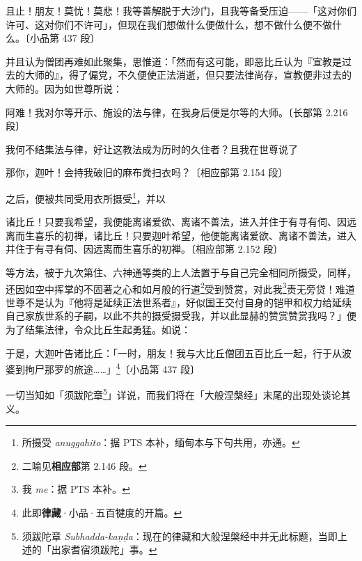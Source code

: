 \begin{quoting}且止！朋友！莫忧！莫悲！我等善解脱于大沙门，且我等备受压迫——「这对你们许可、这对你们不许可」，但现在我们想做什么便做什么，想不做什么便不做什么。{\bluefootnotesize 〔小品第 437 段〕}\end{quoting}

并且认为僧团再难如此聚集，思惟道：「然而有这可能，即恶比丘认为『宣教是过去的大师的』，得了偏党，不久便使正法消逝，但只要法律尚存，宣教便非过去的大师的。因为如世尊所说：

\begin{quoting}阿难！我对尔等开示、施设的法与律，在我身后便是尔等的大师。{\bluefootnotesize 〔长部第 2.216 段〕}\end{quoting}

我何不结集法与律，好让这教法成为历时的久住者？且我在世尊说了

\begin{quoting}那你，迦叶！会持我破旧的麻布粪扫衣吗？{\bluefootnotesize 〔相应部第 2.154 段〕}\end{quoting}

之后，便被共同受用衣所摄受\footnote{所摄受 \textit{anuggahito}：据 PTS 本补，缅甸本与下句共用，亦通。}，并以

\begin{quoting}诸比丘！只要我希望，我便能离诸爱欲、离诸不善法，进入并住于有寻有伺、因远离而生喜乐的初禅，诸比丘！只要迦叶希望，他便能离诸爱欲、离诸不善法，进入并住于有寻有伺、因远离而生喜乐的初禅。{\bluefootnotesize 〔相应部第 2.152 段〕}\end{quoting}

等方法，被于九次第住、六神通等类的上人法置于与自己完全相同所摄受，同样，还因如空中挥掌的不固著之心和如月般的行道\footnote{二喻见\textbf{相应部}第 2.146 段。}受到赞赏，对此我\footnote{我 \textit{me}：据 PTS 本补。}责无旁贷！难道世尊不是认为『他将是延续正法世系者』，好似国王交付自身的铠甲和权力给延续自己家族世系的子嗣，以此不共的摄受摄受我，并以此显赫的赞赏赞赏我吗？」便为了结集法律，令众比丘生起勇猛。如说：

\begin{quoting}于是，大迦叶告诸比丘：「一时，朋友！我与大比丘僧团五百比丘一起，行于从波婆到拘尸那罗的旅途……」\footnote{此即\textbf{律藏}·小品·五百犍度的开篇。}{\bluefootnotesize 〔小品第 437 段〕}\end{quoting}

一切当知如「须跋陀章\footnote{须跋陀章 \textit{Subhadda-kaṇḍa}：现在的律藏和大般涅槃经中并无此标题，当即上述的「出家耆宿须跋陀」事。}」详说，而我们将在「大般涅槃经」末尾的出现处谈论其义。


